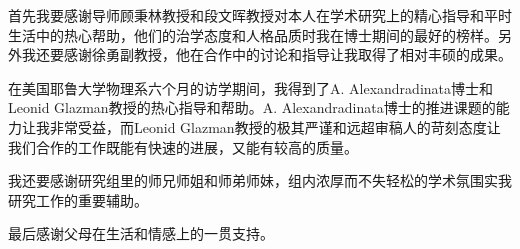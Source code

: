 \begin{acknowledgement}
  首先我要感谢导师顾秉林教授和段文晖教授对本人在学术研究上的精心指导和平时生活中的热心帮助，他们的治学态度和人格品质时我在博士期间的最好的榜样。另外我还要感谢徐勇副教授，他在合作中的讨论和指导让我取得了相对丰硕的成果。

  在美国耶鲁大学物理系六个月的访学期间，我得到了A. Alexandradinata博士和Leonid Glazman教授的热心指导和帮助。A. Alexandradinata博士的推进课题的能力让我非常受益，而Leonid Glazman教授的极其严谨和远超审稿人的苛刻态度让我们合作的工作既能有快速的进展，又能有较高的质量。

  我还要感谢研究组里的师兄师姐和师弟师妹，组内浓厚而不失轻松的学术氛围实我研究工作的重要辅助。

  最后感谢父母在生活和情感上的一贯支持。
\end{acknowledgement}
